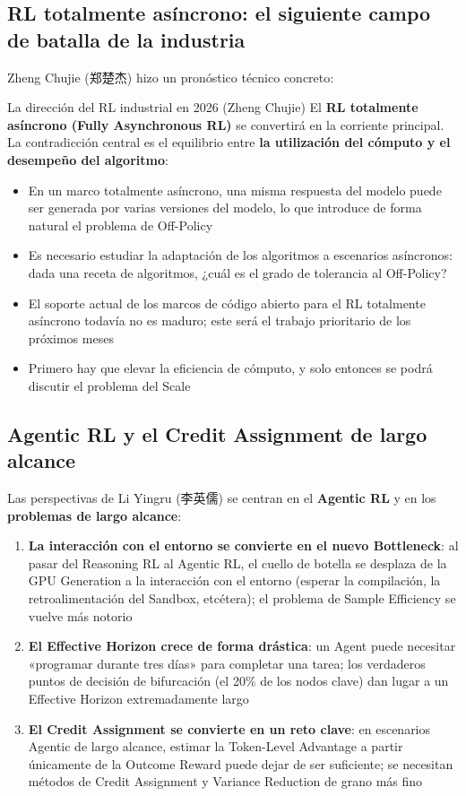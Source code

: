 \documentclass[a4paper]{article}
\begin{document}
\subsection{RL totalmente asíncrono: el siguiente campo de batalla de la industria}

Zheng Chujie (郑楚杰) hizo un pronóstico técnico concreto:

\begin{importantbox}{La dirección del RL industrial en 2026 (Zheng Chujie)}
El \textbf{RL totalmente asíncrono (Fully Asynchronous RL)} se convertirá en la corriente principal. La contradicción central es el equilibrio entre \textbf{la utilización del cómputo y el desempeño del algoritmo}:
\begin{itemize}
    \item En un marco totalmente asíncrono, una misma respuesta del modelo puede ser generada por varias versiones del modelo, lo que introduce de forma natural el problema de Off-Policy
    \item Es necesario estudiar la adaptación de los algoritmos a escenarios asíncronos: dada una receta de algoritmos, ¿cuál es el grado de tolerancia al Off-Policy?
    \item El soporte actual de los marcos de código abierto para el RL totalmente asíncrono todavía no es maduro; este será el trabajo prioritario de los próximos meses
    \item Primero hay que elevar la eficiencia de cómputo, y solo entonces se podrá discutir el problema del Scale
\end{itemize}
\end{importantbox}

\subsection{Agentic RL y el Credit Assignment de largo alcance}

Las perspectivas de Li Yingru (李英儒) se centran en el \textbf{Agentic RL} y en los \textbf{problemas de largo alcance}:

\begin{enumerate}
    \item \textbf{La interacción con el entorno se convierte en el nuevo Bottleneck}: al pasar del Reasoning RL al Agentic RL, el cuello de botella se desplaza de la GPU Generation a la interacción con el entorno (esperar la compilación, la retroalimentación del Sandbox, etcétera); el problema de Sample Efficiency se vuelve más notorio
    \item \textbf{El Effective Horizon crece de forma drástica}: un Agent puede necesitar «programar durante tres días» para completar una tarea; los verdaderos puntos de decisión de bifurcación (el 20\% de los nodos clave) dan lugar a un Effective Horizon extremadamente largo
    \item \textbf{El Credit Assignment se convierte en un reto clave}: en escenarios Agentic de largo alcance, estimar la Token-Level Advantage a partir únicamente de la Outcome Reward puede dejar de ser suficiente; se necesitan métodos de Credit Assignment y Variance Reduction de grano más fino
\end{enumerate}
\end{document}
